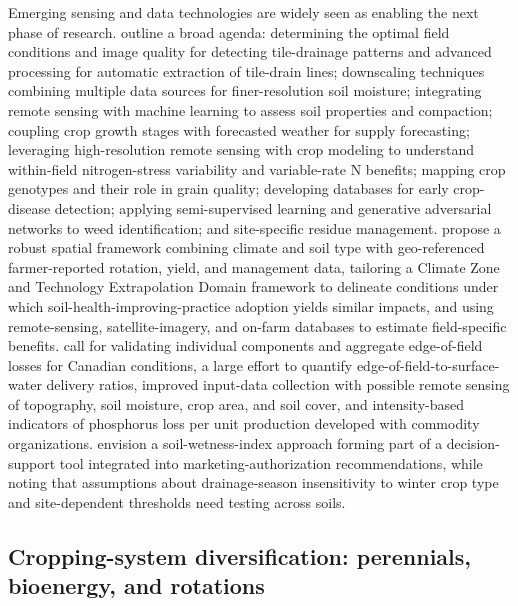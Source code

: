 Emerging sensing and data technologies are widely seen as enabling the next phase of research. \textcite{Khanal2020} outline a broad agenda: determining the optimal field conditions and image quality for detecting tile-drainage patterns and advanced processing for automatic extraction of tile-drain lines; downscaling techniques combining multiple data sources for finer-resolution soil moisture; integrating remote sensing with machine learning to assess soil properties and compaction; coupling crop growth stages with forecasted weather for supply forecasting; leveraging high-resolution remote sensing with crop modeling to understand within-field nitrogen-stress variability and variable-rate N benefits; mapping crop genotypes and their role in grain quality; developing databases for early crop-disease detection; applying semi-supervised learning and generative adversarial networks to weed identification; and site-specific residue management. \textcite{Cassman2025} propose a robust spatial framework combining climate and soil type with geo-referenced farmer-reported rotation, yield, and management data, tailoring a Climate Zone and Technology Extrapolation Domain framework to delineate conditions under which soil-health-improving-practice adoption yields similar impacts, and using remote-sensing, satellite-imagery, and on-farm databases to estimate field-specific benefits. \textcite{Reid2018} call for validating individual components and aggregate edge-of-field losses for Canadian conditions, a large effort to quantify edge-of-field-to-surface-water delivery ratios, improved input-data collection with possible remote sensing of topography, soil moisture, crop area, and soil cover, and intensity-based indicators of phosphorus loss per unit production developed with commodity organizations. \textcite{Julien2023} envision a soil-wetness-index approach forming part of a decision-support tool integrated into marketing-authorization recommendations, while noting that assumptions about drainage-season insensitivity to winter crop type and site-dependent thresholds need testing across soils.

\subsection{Cropping-system diversification: perennials, bioenergy, and rotations}

